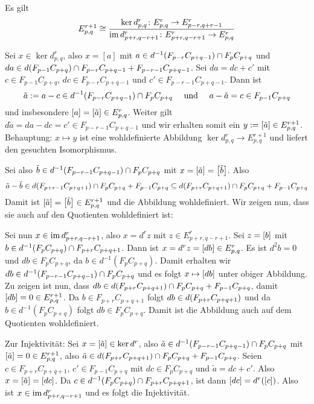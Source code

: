 \begin{lemma}[{name=[{$r+1$-Seite ist Homologie der $r$-Seite}]}]
	Es gilt
	\[
		E^{r+1}_{p,q} \cong \frac{\ker d^r_{p,q} \colon E^r_{p,q} \to E^r_{p-r,q+r-1}}{\im d^r_{p+r,q-r+1} \colon E^r_{p+r,q-r+1} \to E^r_{p,q}} 
	\]
\end{lemma}
\begin{beweis}
	Sei $x \in \ker d^r_{p,q}$, also $x=[a]$ mit $a \in d^{-1} \enbrace*{F_{p-r} C_{p+q-1}} \cap F_p C_{p+q}$ und $d a \in d \enbrace*{F_{p-1} C_{p+q}}\cap F_{p-r}C_{p+q-1} + F_{p-r-1} C_{p+q-1}$.
	Sei $da = dc + c'$ mit $c \in F_{p-1}C_{p+q}$, $d c \in  F_{p-r} C_{p+q-1}$ und $c' \in F_{p-r-1} C_{p+q-1}$.
	Dann ist 
	\[
		\tilde{a} := a-c \in d^{-1} \enbrace*{F_{p-r} C_{p+q-1}} \cap F_p C_{p+q} \quad \text{ und } \quad  a-\tilde{a}=c \in F_{p-1} C_{p+q}
	\]
	und insbesondere $[a]=\benbrace*{\tilde{a}} \in E^r_{p,q}$.
	Weiter gilt $d \tilde{a} = da - dc = c' \in F_{p-r-1} C_{p+q-1}$ und wir erhalten somit ein $y := \benbrace*{\tilde{a}} \in E^{r+1}_{p,q}$.
	Behauptung: $x \mapsto y$ ist eine wohldefinierte Abbildung $\ker d^r_{p,q} \to E^{r+1}_{p,q}$ und liefert den gesuchten Isomorphismus.
	
	Sei also $\tilde{b} \in d^{-1}\enbrace*{F_{p-r-1}C_{p+q-1}}\cap F_pC_{p+q}$ mit $x=\benbrace*{\tilde{a}}=\benbrace*{\tilde{b}}$.
	Also 
	\[
		\tilde{a}- \tilde{b} \in d \enbrace*{F_{p+r-1} C_{p+q+1}}\cap F_p C_{p+q} + F_{p-1} C_{p+q} \subseteq d \enbrace*{F_{p+r} C_{p+q+1}}\cap F_p C_{p+q} + F_{p-1} C_{p+q}
	\]
	Damit ist $\benbrace*{\tilde{a}} = \benbrace*{\tilde{b}} \in E^{r+1}_{p,q}$ und die Abbildung wohldefiniert.
	Wir zeigen nun, dass sie auch auf den Quotienten wohldefiniert ist:
	
	Sei nun $x \in \im d^r_{p+r,q-r+1}$, also $x= d^r z$ mit $z \in E^r_{p+r,q-r+1}$.
	Sei $z=\benbrace*{b}$ mit $b \in d^{-1} \enbrace*{F_p C_{p+q}} \cap F_{p+r} C_{p+q+1}$.
	Dann ist $x = d^r z = \benbrace*{d b} \in E^r_{p,q}$.
	Es ist $d^2b=0$ und $d b \in F_p C_{p+q}$, da $b \in d^{-1}(F_p C_{p+q})$.
	Damit erhalten wir $db \in d^{-1} \enbrace*{F_{p-r-1} C_{p+q-1}} \cap F_p C_{p+q}$ und es folgt $x \mapsto \benbrace*{db}$ unter obiger Abbildung.
	Zu zeigen ist nun, dass $db \in d\enbrace*{F_{p+r} C_{p+q+1}}\cap F_p C_{p+q} + F_{p-1} C_{p+q}$, damit $\benbrace*{db}=0 \in E^{r+1}_{p,q}$.
	Da $b \in F_{p+r} C_{p+q+1}$ folgt $db \in d \enbrace*{F_{p+r} C_{p+q+1}}$ und da $b \in d^{-1}(F_p C_{p+q})$ folgt $db \in F_p C_{p+q}$.
	Damit ist die Abbildung auch auf dem Quotienten wohldefiniert.
	
	Zur Injektivität: Sei $x= \benbrace*{\tilde{a}} \in \ker d^r$, also $\tilde{a} \in d^{-1} \enbrace*{F_{p-r-1} C_{p+q-1}} \cap F_p C_{p+q}$ mit $\benbrace*{\tilde{a}}=0 \in E^{r+1}_{p,q}$, also $\tilde{a} \in d \enbrace*{F_{p+r} C_{p+q+1}} \cap F_p C_{p+q} + F_{p-1} C_{p+q}$.
	Seien $c \in F_{p+r}C_{p+q+1}$, $c' \in F_{p-1}C_{p+q}$ mit $d c \in F_{p} C_{p+q}$ und $\tilde{a} = d c + c'$.
	Also $x= \benbrace*{\tilde{a}}= \benbrace*{d c}$.
	Da $c \in d^{-1} \enbrace*{F_p C_{p+q}} \cap F_{p+r} C_{p+q+1}$, ist dann $\benbrace*{d c}=d^r([c])$. 
	Also ist $x \in \im d^r_{p+r,q-r+1}$ und es folgt die Injektivität.
	

\end{beweis}
